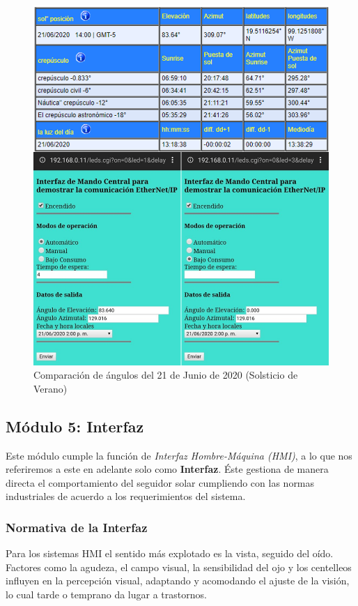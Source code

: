 \begin{figure}[H]
	\centering
	\includegraphics[width=\columnwidth]{imagenes/VAL_V}
	\caption{Comparación de ángulos del 21 de Junio de 2020 (Solsticio de Verano)}
	\label{fig:VAL_V}
\end{figure}

\newpage
\subsection{Módulo 5: Interfaz}
Este módulo cumple la función de \textit{Interfaz Hombre-Máquina (HMI)}, a lo que nos referiremos a este en adelante solo como \textbf{Interfaz}. Éste gestiona de manera directa el comportamiento del seguidor solar cumpliendo con las normas industriales  de acuerdo a los requerimientos del sistema.
\subsubsection{Normativa de la Interfaz}
Para los sistemas HMI el sentido más explotado es la vista, seguido del oído. Factores como la agudeza, el campo visual, la sensibilidad del ojo y los centelleos influyen en la percepción visual, adaptando y acomodando el ajuste de la visión, lo cual tarde o temprano da lugar a trastornos.

